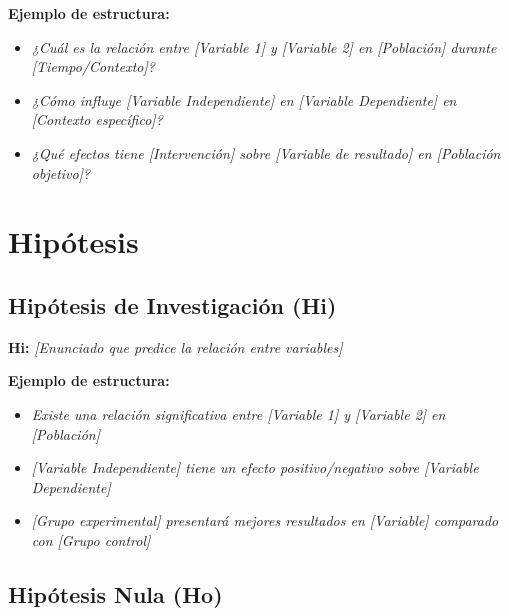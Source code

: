 \textbf{Ejemplo de estructura:}
\begin{itemize}
    \item \textit{¿Cuál es la relación entre [Variable 1] y [Variable 2] en [Población] durante [Tiempo/Contexto]?}
    \item \textit{¿Cómo influye [Variable Independiente] en [Variable Dependiente] en [Contexto específico]?}
    \item \textit{¿Qué efectos tiene [Intervención] sobre [Variable de resultado] en [Población objetivo]?}
\end{itemize}

\section{Hipótesis}
\label{sec:hipotesis}


\subsection{Hipótesis de Investigación (Hi)}
\label{subsec:hipotesis_investigacion}

\textbf{Hi:} \textit{[Enunciado que predice la relación entre variables]}

\textbf{Ejemplo de estructura:}
\begin{itemize}
    \item \textit{Existe una relación significativa entre [Variable 1] y [Variable 2] en [Población]}
    \item \textit{[Variable Independiente] tiene un efecto positivo/negativo sobre [Variable Dependiente]}
    \item \textit{[Grupo experimental] presentará mejores resultados en [Variable] comparado con [Grupo control]}
\end{itemize}

\subsection{Hipótesis Nula (Ho)}
\label{subsec:hipotesis_nula}

